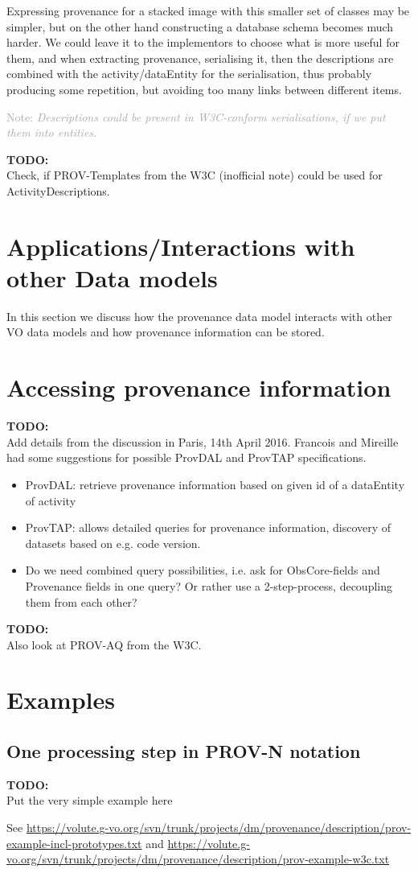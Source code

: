 \documentclass[11pt,a4paper]{ivoa}
\newcommand{\TODO}[1]{%
    \noindent%
    \colorbox{todocolor}{%
            \parbox{0.85\linewidth}{\sffamily \textbf{TODO:}\\
            #1}
    }%
    \vspace{2pt}

}
\newcommand{\Note}[1]{%
    \noindent%
    \textcolor{darkgrey}{{\sffamily Note:} \emph{#1}}%
}
\begin{document}
Expressing provenance for a stacked image with this smaller set of classes may be simpler, but on the other hand constructing a database schema becomes much harder. 
We could leave it to the implementors to choose what is more useful for them, and when extracting provenance, serialising it, then the descriptions are combined with the activity/dataEntity for 
the serialisation, thus probably producing some repetition, but avoiding too many 
links between different items.

\Note{Descriptions could be present in W3C-conform serialisations, if we 
put them into entities.}

\TODO{Check, if PROV-Templates from the W3C (inofficial note) could be used for ActivityDescriptions.}

\section{Applications/Interactions with other Data models}
In this section we discuss how the provenance data model interacts with
other VO data models and how provenance information can be stored.

\section{Accessing provenance information}
\TODO{Add details from the discussion in Paris, 14th April 2016. Francois and 
Mireille had some suggestions for possible ProvDAL and ProvTAP specifications.
\begin{itemize}
\item ProvDAL: retrieve provenance information based on given id of a dataEntity of activity
\item ProvTAP: allows detailed queries for provenance information, discovery of datasets based on 
e.g. code version.
\item Do we need combined query possibilities, i.e. ask for ObsCore-fields and Provenance fields
in one query? Or rather use a 2-step-process, decoupling them from each other?
\end{itemize}
}

\TODO{Also look at PROV-AQ from the W3C.}

\section{Examples}\label{sec:examples}

\subsection{One processing step in PROV-N notation}
\TODO{Put the very simple example here}
See \url{https://volute.g-vo.org/svn/trunk/projects/dm/provenance/description/prov-example-incl-prototypes.txt}
and \url{https://volute.g-vo.org/svn/trunk/projects/dm/provenance/description/prov-example-w3c.txt}
\end{document}
